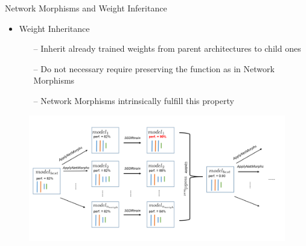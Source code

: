 \begin{frame}{Network Morphisms and Weight Inferitance}
    \begin{itemize}
    	\item \alert{Weight Inheritance} 
	\begin{itemize}
		\item[--] Inherit already trained weights from parent architectures to child ones
		\item[--] Do not necessary require preserving the function as in Network Morphisms
		\item[--] Network Morphisms intrinsically fulfill this property
	\end{itemize}
    \end{itemize}

    \begin{figure}[t]
        \begin{centering}
            \includegraphics[scale=0.3]{images_lec7/NASH.png}
        \end{centering}
    \end{figure}

\end{frame}

